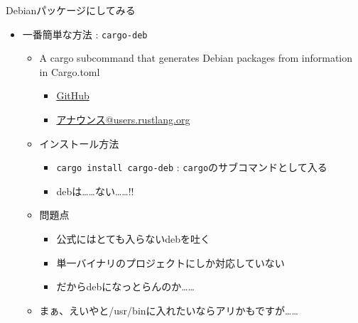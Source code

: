 \documentclass[cjk,dvipdfmx,10pt,compress,fragile%
hyperref={bookmarks=true,bookmarksnumbered=true,bookmarksopen=false,%
colorlinks=false,%
pdftitle={第 134 回 関西 Debian 勉強会},%
pdfauthor={小林},%
pdfsubject={資料},%
}]{beamer}
\begin{document}
\begin{frame}[t,fragile]{Debianパッケージにしてみる}
 \begin{itemize}
  \item 一番簡単な方法 : \texttt{cargo-deb}
	\begin{itemize}
	 \item A cargo subcommand that generates Debian packages from information in Cargo.toml
	       \begin{itemize}
		\item \href{https://github.com/mmstick/cargo-deb}{GitHub}
		\item \href{https://users.rust-lang.org/t/cargo-deb-make-debian-packages-from-cargo-projects/12199}{アナウンス@users.rustlang.org}
	       \end{itemize}
	 \item インストール方法
	       \begin{itemize}
		\item \verb|cargo install cargo-deb| : \verb|cargo|のサブコマンドとして入る
		\item debは……ない……!!
	       \end{itemize}
	 \item 問題点
	       \begin{itemize}
		\item 公式にはとても入らないdebを吐く
		\item 単一バイナリのプロジェクトにしか対応していない
		\item だからdebになっとらんのか……
	       \end{itemize}
	 \item まぁ、えいやと/usr/binに入れたいならアリかもですが……
	\end{itemize}
 \end{itemize}
\end{frame}
\end{document}
